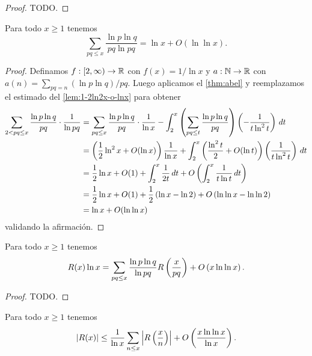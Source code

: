 \begin{proof}
    TODO.
\end{proof}

\begin{lemma}
    \label{lem:lnp-lnq-pq-lnpq}
    Para todo \(x \geq 1\) tenemos
    \[
        \sum_{pq \leq x} \frac{\ln p \ln q}{pq \ln pq}
        = \ln x + O(\ln \ln x).   
    \]
\end{lemma}

\begin{proof}
    Definamos \(f: [2, \infty) \to \mathbb{R}\) con \(f(x) = 1/\ln x\) y
    \(a: \mathbb{N} \to \mathbb{R}\) con \(a(n) = \sum_{pq = n} (\ln p \ln q) / pq\).
    Luego aplicamos el \cref{thm:abel}
    y reemplazamos el estimado del \cref{lem:1-2ln2x-o-lnx} para obtener
    \begin{align*}
        \sum_{2 < pq \leq x} \frac{\ln p \ln q}{pq} \cdot \frac{1}{\ln pq}
        &= \sum_{pq \leq x} \frac{\ln p \ln q}{pq} \cdot \frac{1}{\ln x}
        - \int_2^x \left( \sum_{pq \leq t} \frac{\ln p \ln q}{pq} \right)
        \left( -\frac{1}{t \ln^2 t} \right) \, dt \\
        &= \left( \frac{1}{2} \ln^2x + O(\ln x) \right) \frac{1}{\ln x}
        + \int_2^x \left( \frac{\ln^2 t}{2} + O(\ln t) \right)\left( \frac{1}{t \ln^2 t} \right) \, dt \\
        &= \frac{1}{2}\ln x + O(1) + \int_{2}^x \frac{1}{2t} \, dt + O\left( \int_2^x \frac{1}{t \ln t} \, dt \right) \\
        &= \frac{1}{2}\ln x + O(1) + \frac{1}{2}\left( \ln x - \ln 2 \right) + O\left( \ln \ln x - \ln \ln 2 \right) \\
        &= \ln x + O(\ln \ln x)
    \end{align*}
    validando la afirmaci\'on.
\end{proof}

\begin{lemma}
    \label{lem:rlnx2}
    Para todo \(x \geq 1\) tenemos
    \[
        R(x)\ln x
        = \sum_{pq \leq x} \frac{\ln p \ln q}{\ln pq}
        R\left( \frac{x}{pq} \right) + O\left( x \ln\ln x \right).   
    \]
\end{lemma}

\begin{proof}
    TODO.
\end{proof}

\begin{lemma}
    Para todo \(x \geq 1\) tenemos
    \[
        \left\lvert R(x) \right\rvert
        \leq \frac{1}{\ln x} \sum_{n \leq x} \left\lvert R\left( \frac{x}{n} \right) \right\rvert
        + O\left( \frac{x\ln \ln x}{\ln x} \right).
    \]
\end{lemma}

